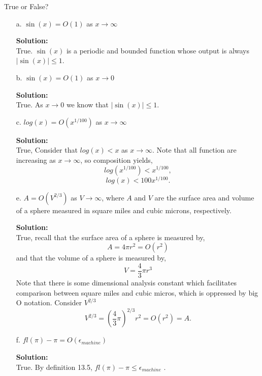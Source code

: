\documentclass[12pt]{article}
\makeatletter
\theoremstyle{homework}
\newenvironment{exercise}[1]
{\def\@currentlabel{#1}\exercisecore}
{\endexercisecore}
\newcommand{\localhead}[1]{\par\smallskip\noindent\textbf{#1}\nobreak\\}%
\newcommand\solution{\localhead{Solution:}}
\makeatother
\begin{document}
  \begin{exercise}{14.1} True or False?\\
    \begin{enumerate}
      \item[a.] $\sin(x) = O(1)$ as $x \to \infty$\\
      \solution True. $\sin(x)$ is a periodic and bounded function whose output is always $|\sin(x)| \leq 1$.
      \item[b.] $\sin(x) = O(1)$ as $x \to 0$\\
      \solution True. As $x \to 0$ we know that $|\sin(x)| \leq 1$. 
      \item[c.] $log(x) = O(x^{1/100})$ as $x \to \infty$\\
      \solution  True, Consider that $log(x)<x$ as $x \to \infty$. Note that all function are increasing as $x \to \infty$, so composition yields, 
      \begin{equation*}
      log(x^{1/100}) < x^{1/100},
    \end{equation*}
    \begin{equation*}
      log(x) < 100x^{1/100}.
    \end{equation*}
      \item[e.] $A = O(V^{2/3})$ as $V \to \infty$, where $A$ and $V$ are the surface area and volume of a 
      sphere measured in square miles and cubic microns, respectively. \\
      \solution True, recall that the surface area of a sphere is measured by, 
      \begin{equation*}
        A = 4\pi r^2 = O(r^2)
      \end{equation*}
      and that the volume of a sphere is measured by, 
      \begin{equation*}
        V = \frac{4}{3}\pi r^3
      \end{equation*}
      Note that there is some dimensional analysis constant which facilitates comparison between square miles and cubic micros, which is oppressed by 
      big O notation. Consider $V^{2/3}$
      \begin{equation*}
        V^{2/3} = (\frac{4}{3}\pi)^{2/3} r^2 = O(r^2) = A.
      \end{equation*}
      \item[f.] $fl(\pi) - \pi = O(\epsilon_{machine})$\\
      \solution True. By definition 13.5, $fl(\pi) - \pi \leq \epsilon_{machine}$ .
    \end{enumerate}
    
  \end{exercise}
\end{document}
